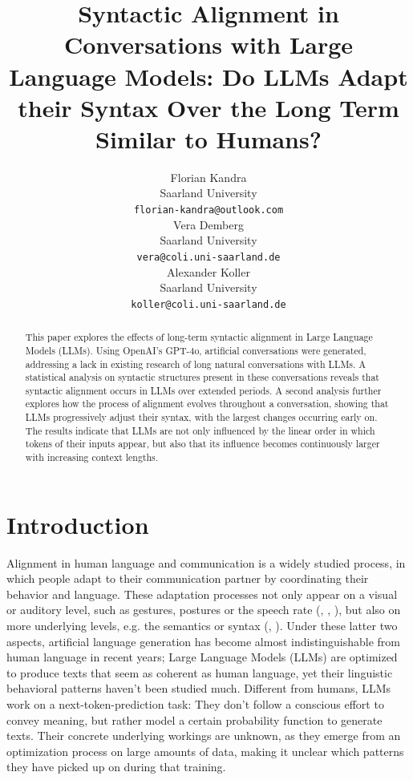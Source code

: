 \documentclass[11pt]{article}
\title{Syntactic Alignment in Conversations with Large Language Models: Do LLMs Adapt their Syntax Over the Long Term Similar to Humans?}
\author{Florian Kandra \\
  Saarland University \\
  \texttt{florian-kandra@outlook.com} \\\And
  Vera Demberg \\
  Saarland University \\
  \texttt{vera@coli.uni-saarland.de} \\\AND
  Alexander Koller \\
  Saarland University \\
  \texttt{koller@coli.uni-saarland.de} \\}
\begin{document}
\maketitle
\begin{abstract}
This paper explores the effects of long-term syntactic alignment in Large Language Models (LLMs). Using OpenAI's GPT-4o, artificial conversations were generated, addressing a lack in existing research of long natural conversations with LLMs.
A statistical analysis on syntactic structures present in these conversations reveals that syntactic alignment occurs in LLMs over extended periods. A second analysis further explores how the process of alignment evolves throughout a conversation, showing that LLMs progressively adjust their syntax, with the largest changes occurring early on.
The results indicate that LLMs are not only influenced by the linear order in which tokens of their inputs appear, but also that its influence becomes continuously larger with increasing context lengths.
\end{abstract}

\section{Introduction}

Alignment in human language and communication is a widely studied process, in which people adapt to their communication partner by coordinating their behavior and language. These adaptation processes not only appear on a visual or auditory level, such as gestures, postures or the speech rate (\citealp{Holler2011mimicry}, \citealp{shockley2009coordinative}, \citealp{jungers2009speech}), but also on more underlying levels, e.g. the semantics or syntax (\citealp{BOCK1986355}, \citealp{garrod1987semanticcoord}).
Under these latter two aspects, artificial language generation has become almost indistinguishable from human language in recent years;
Large Language Models (LLMs) are optimized to produce texts that seem as coherent as human language, yet their linguistic behavioral patterns haven't been studied much. Different from humans, LLMs work on a next-token-prediction task: They don't follow a conscious effort to convey meaning, but rather model a certain probability function to generate texts. Their concrete underlying workings are unknown, as they emerge from an optimization process on large amounts of data, making it unclear which patterns they have picked up on during that training.
\end{document}
